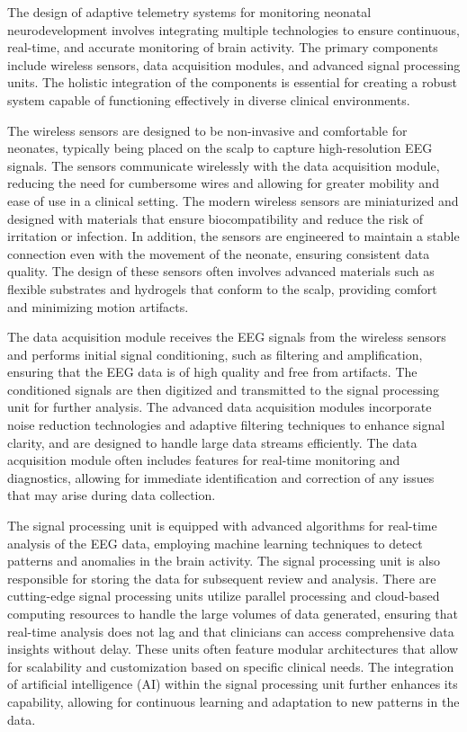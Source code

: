 \documentclass[12pt,journal,compsoc]{IEEEtran}
\begin{document}
The design of adaptive telemetry systems for monitoring neonatal neurodevelopment involves integrating multiple technologies to ensure continuous, real-time, and accurate monitoring of brain activity. The primary components include wireless sensors, data acquisition modules, and advanced signal processing units. The holistic integration of the components is essential for creating a robust system capable of functioning effectively in diverse clinical environments.

The wireless sensors are designed to be non-invasive and comfortable for neonates, typically being placed on the scalp to capture high-resolution EEG signals. The sensors communicate wirelessly with the data acquisition module, reducing the need for cumbersome wires and allowing for greater mobility and ease of use in a clinical setting. The modern wireless sensors are miniaturized and designed with materials that ensure biocompatibility and reduce the risk of irritation or infection. In addition, the sensors are engineered to maintain a stable connection even with the movement of the neonate, ensuring consistent data quality. The design of these sensors often involves advanced materials such as flexible substrates and hydrogels that conform to the scalp, providing comfort and minimizing motion artifacts. 

The data acquisition module receives the EEG signals from the wireless sensors and performs initial signal conditioning, such as filtering and amplification, ensuring that the EEG data is of high quality and free from artifacts. The conditioned signals are then digitized and transmitted to the signal processing unit for further analysis. The advanced data acquisition modules incorporate noise reduction technologies and adaptive filtering techniques to enhance signal clarity, and are designed to handle large data streams efficiently. The data acquisition module often includes features for real-time monitoring and diagnostics, allowing for immediate identification and correction of any issues that may arise during data collection.

The signal processing unit is equipped with advanced algorithms for real-time analysis of the EEG data, employing machine learning techniques to detect patterns and anomalies in the brain activity. The signal processing unit is also responsible for storing the data for subsequent review and analysis. There are cutting-edge signal processing units utilize parallel processing and cloud-based computing resources to handle the large volumes of data generated, ensuring that real-time analysis does not lag and that clinicians can access comprehensive data insights without delay. These units often feature modular architectures that allow for scalability and customization based on specific clinical needs. The integration of artificial intelligence (AI) within the signal processing unit further enhances its capability, allowing for continuous learning and adaptation to new patterns in the data. 
\end{document}
